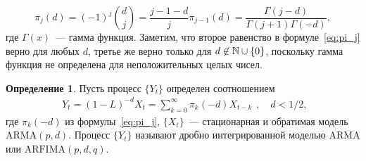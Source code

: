 \documentclass[specialist,
substylefile = spbu_report.rtx,
subf,href,colorlinks=true, 12pt]{disser}
\theoremstyle{definition}
\newtheorem{definition}{Определение}[section]
\newtheorem{remark}{Замечание}[section]
\newtheorem{assumption}{Предположение}[section]
\begin{document}
\begin{equation}\label{eq:pi_j}
	\pi_j(d)=(-1)^j\binom{d}{j}=\frac{j-1-d}{j}\pi_{j-1}(d)=\frac{\Gamma(j-d)}{\Gamma(j+1)\Gamma(-d)},
\end{equation}
где $\Gamma(x)$~--- гамма функция. Заметим, что второе равенство в формуле~\eqref{eq:pi_j} верно для любых $d$, третье же верно только для $d\not\in\mathbb{N}\cup\{0\}$, поскольку гамма функция не определена для неположительных целых чисел.
\begin{definition}\label{def:arfima}
	Пусть процесс $\{Y_t\}$ определен соотношением
	\[
		\begin{aligned}
			Y_t=(1-L)^{-d}X_t=\sum_{k=0}^\infty \pi_k(-d)X_{t-k}
		\end{aligned},\quad d<1/2,
	\]
	где $\pi_k(-d)$ из формулы~\eqref{eq:pi_j}, $\{X_t\}$~--- стационарная и обратимая модель $\mathrm{ARMA}(p, d)$. Процесс $\{Y_t\}$ называют дробно интегрированной моделью $\mathrm{ARMA}$ или $\mathrm{ARFIMA}(p, d, q)$.
\end{definition}
\end{document}
